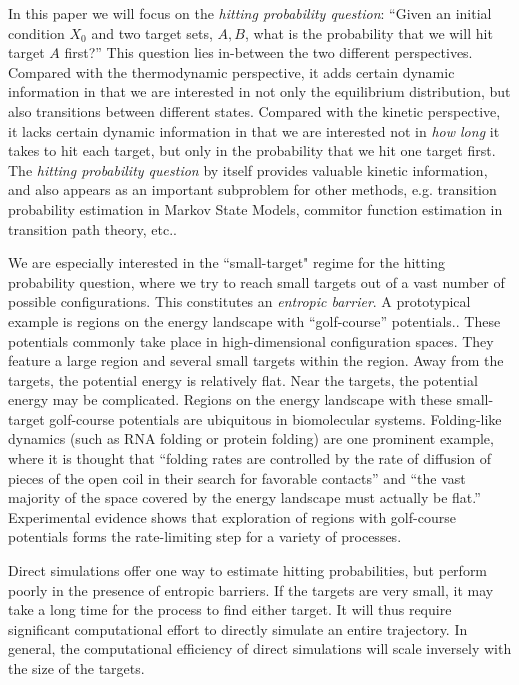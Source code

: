 \documentclass[english, aip, jcp, priprint, graphicx,floatfix]{revtex4-1}
\theoremstyle{plain}
\theoremstyle{definition}
\theoremstyle{plain}
\begin{document}
In this paper we will focus on the \emph{hitting probability question}: ``Given an initial condition $X_0$ and two target sets, $A,B$, what is the probability that we will hit target $A$ first?'' This question lies in-between the two different perspectives. Compared with the thermodynamic perspective, it adds certain dynamic information in that we are interested in not only the equilibrium distribution, but also transitions between different states. Compared with the kinetic perspective, it lacks certain dynamic information in that we are interested not in \emph{how long} it takes to hit each target, but only in the probability that we hit one target first. The \emph{hitting probability question} by itself provides valuable kinetic information, and also appears as an important subproblem for other methods, e.g. transition probability estimation in Markov State Models, commitor function estimation in transition path theory, etc..

We are especially interested in the ``small-target" regime for the hitting probability question, where we try to reach small targets out of a vast number of possible configurations. This constitutes an \emph{entropic barrier}. A prototypical example is regions on the energy landscape with ``golf-course'' potentials.\cite{bicout2000entropic, Baum1986-we, Wille1987-tf}. These potentials commonly take place in high-dimensional configuration spaces. They feature a large region and several small targets within the region.  Away from the targets, the potential energy is relatively flat.  Near the targets, the potential energy may be complicated. Regions on the energy landscape with these small-target golf-course potentials are ubiquitous in biomolecular systems. Folding-like dynamics (such as RNA folding or protein folding) are one prominent example, where it is thought that ``folding rates are controlled by the rate of diffusion of pieces of the open coil in their search for favorable contacts'' and ``the vast majority of the space covered by the energy landscape must actually be flat.''\cite{McLeish2005-dq} Experimental evidence shows that exploration of regions with golf-course potentials forms the rate-limiting step for a variety of processes.\cite{Teschner1987-qs, Jacob1999-bs, Goldberg1999-mv, Plaxco1998-iv}

Direct simulations offer one way to estimate hitting probabilities, but perform poorly in the presence of entropic barriers. If the targets are very small, it may take a long time for the process to find either target.  It will thus require significant  computational effort to directly simulate an entire trajectory. In general, the computational efficiency of direct simulations will scale inversely with the size of the targets.
\end{document}
